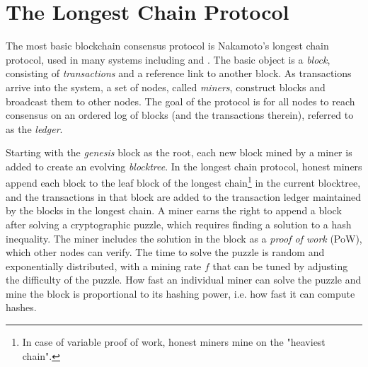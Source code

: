 \chapter{The Longest Chain Protocol}
\label{sec:background}





The most basic blockchain consensus protocol is Nakamoto's longest chain protocol, used in many systems including \bitcoin and \ethereum.  The basic object is a {\em block}, consisting of {\em transactions} and a reference link to another block. 
As transactions arrive into the system, a set of nodes, called {\em miners}, construct blocks and broadcast them to other nodes. The goal of the protocol is for all nodes to reach consensus on an ordered log of blocks (and the transactions therein), referred to as the {\em ledger}.

Starting with the {\em genesis} block as the root, each new block mined by a miner is added to create an evolving {\em blocktree}. In the longest chain protocol, honest miners append each block to the leaf block of the longest chain\footnote{In case of variable proof of work, honest miners mine on the "heaviest chain".} in the current blocktree, and the transactions in that block are added to the transaction ledger maintained by the blocks in the longest chain. 
A miner earns the right to append a block after solving a cryptographic puzzle, which requires finding a solution to a hash inequality.
 The miner includes the solution in the block as a {\em proof of work} (PoW), which other nodes can verify.  The time to solve the puzzle is random and exponentially distributed, with a mining rate $f$ that can be tuned by adjusting the difficulty of the puzzle. How fast an individual miner can solve the puzzle and mine the block is proportional to its hashing power, i.e. how fast it can compute hashes. 
 
